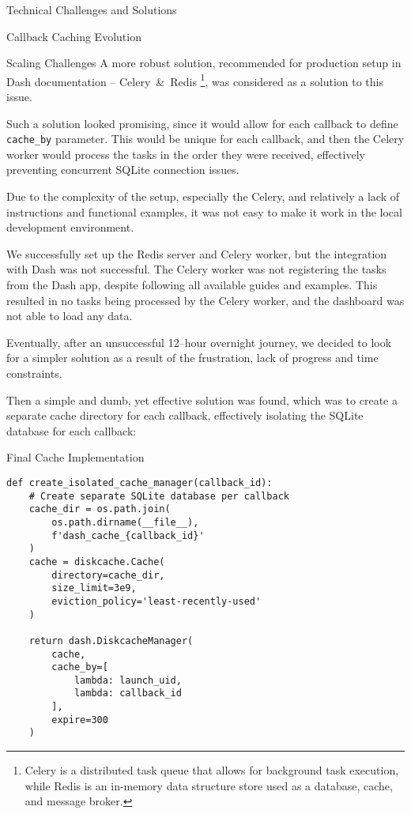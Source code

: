 \begin{section}{Technical Challenges and Solutions}
\begin{subsection}{Callback Caching Evolution}
\begin{subsubsection}{Scaling Challenges}
			A more robust solution, recommended for production setup in Dash documentation – Celery\cite{celery_getting_started_introduction}~\&~Redis\cite{redis_latest}
			\footnote{
				Celery is a distributed task queue that allows for background task execution, while Redis is an in-memory data structure store used as a database, cache, and message broker\cite{reintech_blog_combining_celery_redis_caching_task_queuing}.
			}, was considered as a solution to this issue.

			Such a solution looked promising, since it would allow for each callback to define \texttt{cache\_by} parameter.
			This would be unique for each callback, and then the Celery worker would process the tasks in the order they were received, effectively preventing concurrent SQLite connection issues.

			Due to the complexity of the setup, especially the Celery, and relatively a lack of instructions and functional examples, it was not easy to make it work in the local development environment.

			We successfully set up the Redis server and Celery worker, but the integration with Dash was not successful.
			The Celery worker was not registering the tasks from the Dash app, despite following all available guides and examples.
			This resulted in no tasks being processed by the Celery worker, and the dashboard was not able to load any data.

			Eventually, after an unsuccessful 12–hour overnight journey, we decided to look for a simpler solution as a result of the frustration, lack of progress and time constraints.

			Then a simple and dumb, yet effective solution was found, which was to create a separate cache directory for each callback, effectively isolating the SQLite database for each callback:

			\begin{listing}[H]
				\caption{Final Cache Implementation}
				\begin{verbatim}
def create_isolated_cache_manager(callback_id):
    # Create separate SQLite database per callback
    cache_dir = os.path.join(
        os.path.dirname(__file__),
        f'dash_cache_{callback_id}'
    )
    cache = diskcache.Cache(
        directory=cache_dir,
        size_limit=3e9,
        eviction_policy='least-recently-used'
    )

    return dash.DiskcacheManager(
        cache,
        cache_by=[
            lambda: launch_uid,
            lambda: callback_id
        ],
        expire=300
    )
				\end{verbatim}
				\label{lst:dashboard-implementation-cache-final}
			\end{listing}


\end{subsubsection}
\end{subsection}
\end{section}
